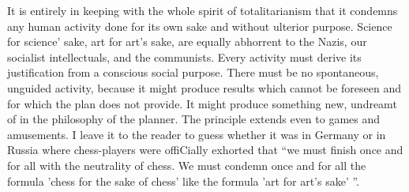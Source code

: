 \documentclass[11pt,openany]{book}
\begin{document}
It is entirely in keeping with the whole spirit of totalitarianism that it condemns any human activity done for its own sake and without ulterior purpose. Science for science' sake, art for art's sake, are equally abhorrent to the Nazis, our socialist intellectuals, and the communists. Every activity must derive its justification from a conscious social purpose. There must be no spontaneous, unguided activity, because it might produce results which cannot be foreseen and for which the plan does not provide. It might produce something new, undreamt of in the philosophy of the planner. The principle extends even to games and amusements. I leave it to the reader to guess whether it was in Germany or in Russia where chess-players were offiCially exhorted that ``we must finish once and for all with the neutrality of chess. We must condemn once and for all the formula 'chess for the sake of chess' like the formula 'art for art's sake' ''.
\end{document}
